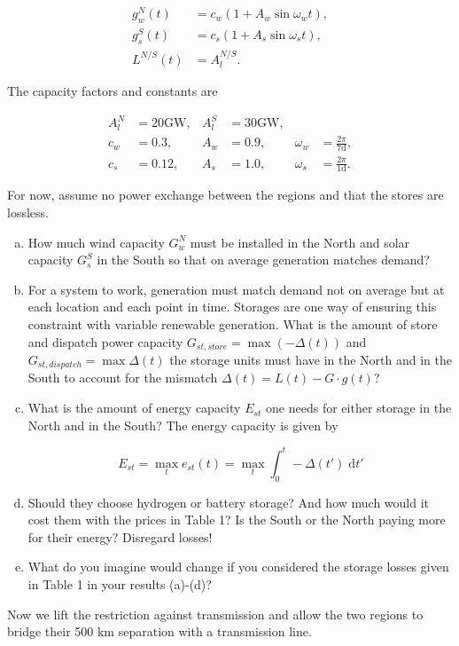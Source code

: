 \documentclass[11pt,a4paper,fleqn]{scrartcl}
\begin{document}
\vspace{-0.5em}

\begin{align*}
 g_{w}^N(t) & = c_w(1+A_w \sin \omega_w t), \\
 g_{s}^S(t) & = c_s(1+A_s \sin \omega_s t), \\
 L^{N/S}(t) & = A_{l}^{N/S}.
\end{align*}

The capacity factors and constants are

\begin{align*}
 A_{l}^{N} & = 20 \si{\giga\watt}, & A_{l}^{S} & = 30 \si{\giga\watt},                                         \\
 c_w    & = 0.3,                & A_w     & = 0.9,                & \omega_w & = \frac{2\pi}{7 \text{d}}, \\
 c_s    & = 0.12,               & A_s     & = 1.0,                & \omega_s & = \frac{2\pi}{1 \text{d}}.
\end{align*}

For now, assume no power exchange between the regions and that the stores are lossless.

\begin{enumerate}[(a)]
 \item How much wind capacity $G^{N}_{w}$ must be installed in the North and solar capacity $G_s^S$ in the South so that on average generation matches demand?

 \item For a system to work, generation must match demand not on average but at each location and each point in time. Storages are one way of ensuring this constraint with variable renewable generation. What is the amount of store and dispatch power capacity $G_{st,store}=\max(-\Delta(t))$ and $G_{st,dispatch} = \max \Delta(t)$ the storage units must have in the North and in the South to account for the mismatch $\Delta(t)=L(t)-G\cdot g(t)$?
\newpage
 \item What is the amount of energy capacity $E_{st}$ one needs for either storage in the North and in the South? The energy capacity is given by

       \begin{equation*}
        E_{st} = \max_t e_{st}(t) = \max_t \int_{0}^{t} -\Delta(t') \;\mathrm{d}t'
       \end{equation*}

 \item Should they choose hydrogen or battery storage? And how much would it cost them with the prices in Table 1? Is the South or the North paying more for their energy? Disregard losses!

 \item What do you imagine would change if you considered the storage losses given in Table 1 in your results (a)-(d)?

\end{enumerate}
Now we lift the restriction against transmission and allow the two regions to bridge their 500 km separation with a transmission line.
\end{document}

